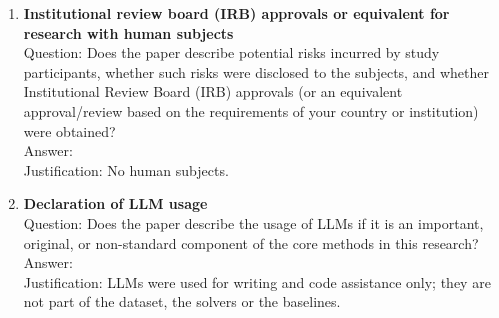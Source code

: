 \documentclass{article}
\begin{document}
\begin{enumerate}
    Answer: \answerNA{}\\
    Justification: No human subjects.
\item {\bf Institutional review board (IRB) approvals or equivalent for research with human subjects}\\
    Question: Does the paper describe potential risks incurred by study participants, whether such risks were disclosed to the subjects, and whether Institutional Review Board (IRB) approvals (or an equivalent approval/review based on the requirements of your country or institution) were obtained?\\
    Answer: \answerNA{}\\
    Justification: No human subjects.
\item {\bf Declaration of LLM usage}\\
    Question: Does the paper describe the usage of LLMs if it is an important, original, or non-standard component of the core methods in this research?\\
    Answer: \answerNA{}\\
    Justification: LLMs were used for writing and code assistance only; they are not part of the dataset, the solvers or the baselines.
\end{enumerate}
\end{document}
